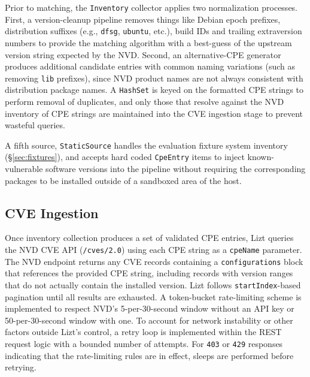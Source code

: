 \documentclass[conference]{IEEEtran}
\begin{document}
Prior to matching, the \texttt{Inventory} collector applies two normalization processes. First, a version-cleanup pipeline removes things like Debian epoch prefixes, distribution suffixes (e.g., \texttt{dfsg}, \texttt{ubuntu}, etc.), build IDs and trailing extraversion numbers to provide the matching algorithm with a best-guess of the upstream version string expected by the NVD. Second, an alternative-CPE generator produces additional candidate entries with common naming variations (such as removing \texttt{lib} prefixes), since NVD product names are not always consistent with distribution package names. A \texttt{HashSet} is keyed on the formatted CPE strings to perform removal of duplicates, and only those that resolve against the NVD inventory of CPE strings are maintained into the CVE ingestion stage to prevent wasteful queries.

A fifth source, \texttt{StaticSource} handles the evaluation fixture system inventory (\S\ref{sec:fixtures}), and accepts hard coded \texttt{CpeEntry} items to inject known-vulnerable software versions into the pipeline without requiring the corresponding packages to be installed outside of a sandboxed area of the host.

\subsection{CVE Ingestion}
Once inventory collection produces a set of validated CPE entries, Lizt queries the NVD CVE API (\texttt{/cves/2.0}) using each CPE string as a \texttt{cpeName} parameter. The NVD endpoint returns any CVE records containing a \texttt{configurations} block that references the provided CPE string, including records with version ranges that do not actually contain the installed version. Lizt follows \texttt{startIndex}-based pagination until all results are exhausted. A token-bucket rate-limiting scheme is implemented to respect NVD's 5-per-30-second window without an API key or 50-per-30-second window with one. To account for network instability or other factors outside Lizt's control, a retry loop is implemented within the REST request logic with a bounded number of attempts. For \texttt{403} or \texttt{429} responses indicating that the rate-limiting rules are in effect, sleeps are performed before retrying.
\end{document}
